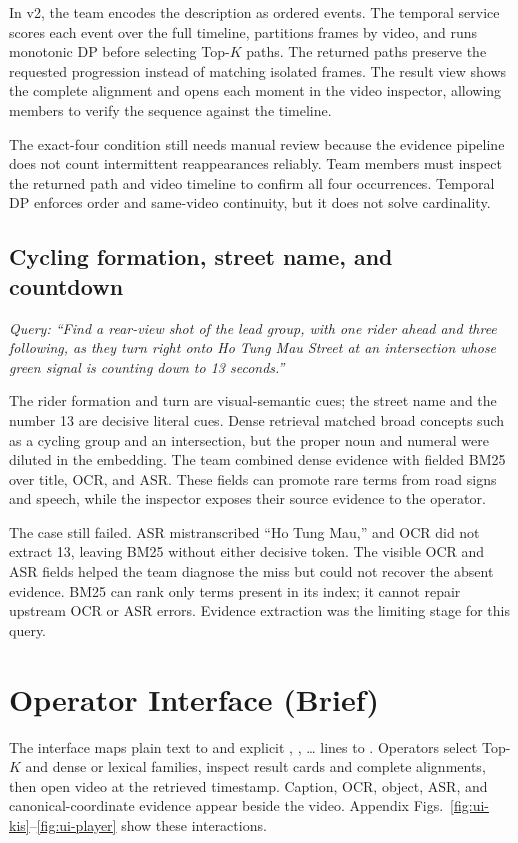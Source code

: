 In v2, the team encodes the description as ordered events. The temporal service
scores each event over the full timeline, partitions frames by video, and runs
monotonic DP before selecting Top-$K$ paths. The returned paths preserve the
requested progression instead of matching isolated frames. The result view shows
the complete alignment and opens each moment in the video inspector, allowing
members to verify the sequence against the timeline.

The exact-four condition still needs manual review because the evidence pipeline
does not count intermittent reappearances reliably. Team members must inspect the
returned path and video timeline to confirm all four occurrences. Temporal DP
enforces order and same-video continuity, but it does not solve cardinality.

\subsection{Cycling formation, street name, and countdown}

\emph{Query: ``Find a rear-view shot of the lead group, with one rider ahead and
three following, as they turn right onto Ho Tung Mau Street at an intersection
whose green signal is counting down to 13 seconds.''}

The rider formation and turn are visual-semantic cues; the street name and the
number 13 are decisive literal cues. Dense retrieval matched broad concepts such
as a cycling group and an intersection, but the proper noun and numeral were
diluted in the embedding. The team combined dense evidence with fielded BM25
over title, OCR, and ASR. These fields can promote rare terms from road signs and
speech, while the inspector exposes their source evidence to the operator.

The case still failed. ASR mistranscribed ``Ho Tung Mau,'' and OCR did not extract
13, leaving BM25 without either decisive token. The visible OCR and ASR fields
helped the team diagnose the miss but could not recover the absent evidence.
BM25 can rank only terms present in its index; it cannot repair upstream OCR or
ASR errors. Evidence extraction was the limiting stage for this query.

\section{Operator Interface (Brief)}

The interface maps plain text to \KIS{} and explicit , ,
\ldots{} lines to \TRAKE. Operators select Top-$K$ and dense or lexical families,
inspect result cards and complete alignments, then open video at the retrieved
timestamp. Caption, OCR, object, ASR, and canonical-coordinate evidence appear
beside the video. Appendix Figs.~\ref{fig:ui-kis}--\ref{fig:ui-player} show these
interactions.

